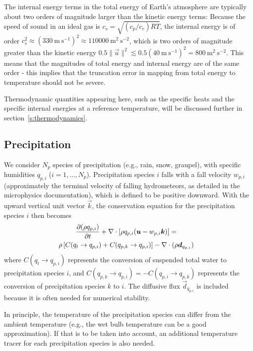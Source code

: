 \documentclass{article}
\begin{document}
The internal energy terms in the total energy of Earth's atmosphere are typically about two orders of magnitude larger than the kinetic energy terms: Because the speed of sound in an ideal gas is $c_s = \sqrt{(c_p/c_v) R T}$, the internal energy is of order $c_s^2 \approx (330~\mathrm{m~s^{-1}})^2 \approx 110000~\mathrm{m^2~s^{-2}}$, which is two orders of magnitude greater than the kinetic energy $0.5 \|\vec{u}\|^2 \lesssim 0.5(40~\mathrm{m~s^{-1}})^2 = 800~\mathrm{m^2~s^{-2}}$. This means that the magnitudes of total energy and internal energy are of the same order - this implies that the truncation error in mapping from total energy to temperature should not be severe.

Thermodynamic quantities appearing here, such as the specific heats and the specific internal energies at a reference temperature, will be discussed further in section~\ref{s:thermodynamics}.

\subsection{Precipitation}

We  consider $N_p$ species of precipitation (e.g., rain, snow, graupel), with specific humidities $q_{p,i}$ ($i=1,\dots,N_p$). Precipitation species $i$ falls with a fall velocity $w_{p,i}$ (approximately the terminal velocity of falling hydrometeors, as detailed in the microphysics documentation), which is defined to be positive downward. With the upward vertical unit vector $\vec{k}$, the conservation equation for the precipitation species $i$ then becomes
\begin{multline}
\frac{\partial (\rho q_{p,i})}{\partial t} + \nabla \cdot \left[\rho q_{p,i} (\boldsymbol{{u}} - w_{p,i} \boldsymbol{{k}}) \right] =\\
\rho \left[C(q_t \rightarrow q_{p,i}) + C(q_{p,k} \rightarrow q_{p,i}) \right] -\nabla \cdot (\rho \boldsymbol{{d}}_{q_{p, i}})\\
\label{eq:precip}
\end{multline}
where $C(q_t \rightarrow q_{p,i})$ represents the conversion of suspended total water to precipitation species $i$, and $C(q_{p,k} \rightarrow q_{p,i}) = -C(q_{p,i} \rightarrow q_{p,k})$ represents the conversion of precipitation species $k$ to $i$. The diffusive flux $\vec{d}_{q_{p, i}}$ is included because it is often needed for numerical stability.

In principle, the temperature of the precipitation species can differ from the ambient temperature (e.g., the wet bulb temperature can be a good approximation). If that is to be taken into account, an additional temperature tracer for each precipitation species is also needed.
\end{document}
